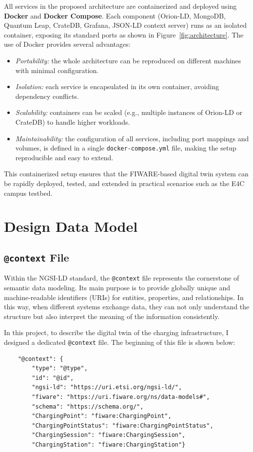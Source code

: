 All services in the proposed architecture are containerized and deployed
using \textbf{Docker} and \textbf{Docker Compose}. Each component
(Orion-LD, MongoDB, Quantum Leap, CrateDB, Grafana, JSON-LD
context server) runs as an isolated container, exposing its standard
ports as shown in Figure~\ref{fig:architecture}. The use of
Docker provides several advantages:
\begin{itemize}
  \item \emph{Portability:} the whole architecture can be reproduced on
  different machines with minimal configuration.
  \item \emph{Isolation:} each service is encapsulated in its own
  container, avoiding dependency conflicts.
  \item \emph{Scalability:} containers can be scaled (e.g., multiple
  instances of Orion-LD or CrateDB) to handle higher workloads.
  \item \emph{Maintainability:} the configuration of all services,
  including port mappings and volumes, is defined in a single
  \texttt{docker-compose.yml} file, making the setup reproducible and
  easy to extend.
\end{itemize}

This containerized setup ensures that the FIWARE-based digital twin
system can be rapidly deployed, tested, and extended in practical
scenarios such as the E4C campus testbed.

\section{Design Data Model}

\subsection*{\texttt{@context} File}
Within the NGSI-LD standard, the \texttt{@context} file represents the cornerstone of semantic data modeling. Its main purpose is to provide globally unique and machine-readable identifiers (URIs) for entities, properties, and relationships. In this way, when different systems exchange data, they can not only understand the structure but also interpret the meaning of the information consistently.

In this project, to describe the digital twin of the charging infrastructure, I designed a dedicated \texttt{@context} file. The beginning of this file is shown below:

\begin{verbatim}
    "@context": {
        "type": "@type",
        "id": "@id",
        "ngsi-ld": "https://uri.etsi.org/ngsi-ld/",
        "fiware": "https://uri.fiware.org/ns/data-models#",
        "schema": "https://schema.org/",
        "ChargingPoint": "fiware:ChargingPoint",
        "ChargingPointStatus": "fiware:ChargingPointStatus",
        "ChargingSession": "fiware:ChargingSession",
        "ChargingStation": "fiware:ChargingStation"}
\end{verbatim}

